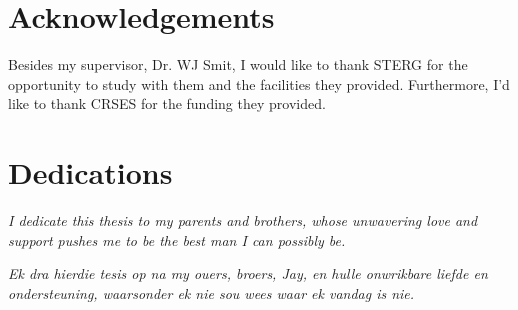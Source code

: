 \chapter{Acknowledgements}%

Besides my supervisor, Dr. WJ Smit, I would like to thank STERG for the opportunity to study with them and the facilities they provided. Furthermore, I'd like to thank CRSES for the funding they provided. 

\chapter{Dedications}%

\vfill
\begin{center}\itshape%
  I dedicate this thesis to my parents and brothers, whose unwavering love and support pushes me to be the best man I can possibly be. 
\end{center}
\vfill

\vfill
\begin{Afr}
  \begin{center}\itshape%
    Ek dra hierdie tesis op na my ouers, broers, Jay, en hulle onwrikbare liefde en ondersteuning, waarsonder ek nie sou wees waar ek vandag is nie. 
  \end{center}
\end{Afr}
\vfill
\clearpage
	   
\endinput
